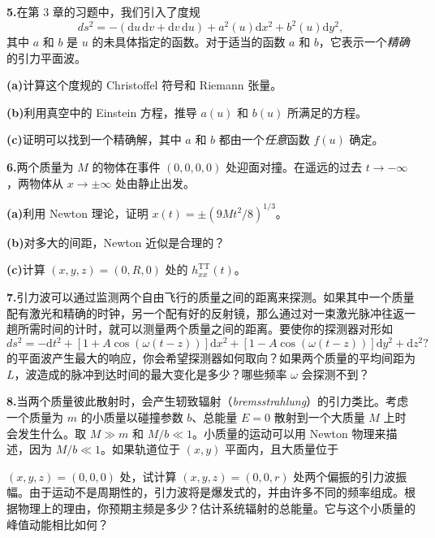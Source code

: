 \textbf{5.}\quad 在第 3 章的习题中，我们引入了度规
\begin{equation*}
ds^2 = -(\mathrm{d}u\,\mathrm{d}v + \mathrm{d}v\,\mathrm{d}u) + a^2(u)\mathrm{d}x^2 + b^2(u)\mathrm{d}y^2,
\tag{7.206}
\end{equation*}
其中 $a$ 和 $b$ 是 $u$ 的未具体指定的函数。对于适当的函数 $a$ 和 $b$，它表示一个\emph{精确}的引力平面波。

\textbf{(a)}\quad 计算这个度规的 Christoffel 符号和 Riemann 张量。

\textbf{(b)}\quad 利用真空中的 Einstein 方程，推导 $a(u)$ 和 $b(u)$ 所满足的方程。

\textbf{(c)}\quad 证明可以找到一个精确解，其中 $a$ 和 $b$ 都由一个\emph{任意}函数 $f(u)$ 确定。

\textbf{6.}\quad 两个质量为 $M$ 的物体在事件 $(0,0,0,0)$ 处迎面对撞。在遥远的过去 $t \to -\infty$，两物体从 $x \to \pm\infty$ 处由静止出发。

\textbf{(a)}\quad 利用 Newton 理论，证明 $x(t) = \pm(9Mt^2/8)^{1/3}$。

\textbf{(b)}\quad 对多大的间距，Newton 近似是合理的？

\textbf{(c)}\quad 计算 $(x, y, z) = (0, R, 0)$ 处的 $h^{\mathrm{TT}}_{xx}(t)$。

\textbf{7.}\quad 引力波可以通过监测两个自由飞行的质量之间的距离来探测。如果其中一个质量配有激光和精确的时钟，另一个配有好的反射镜，那么通过对一束激光脉冲往返一趟所需时间的计时，就可以测量两个质量之间的距离。要使你的探测器对形如
\begin{equation*}
ds^2 = -\mathrm{d}t^2 + \left[1 + A\cos(\omega(t-z))\right]\mathrm{d}x^2 + \left[1 - A\cos(\omega(t-z))\right]\mathrm{d}y^2 + \mathrm{d}z^2?
\end{equation*}
的平面波产生最大的响应，你会希望探测器如何取向？如果两个质量的平均间距为 $L$，波造成的脉冲到达时间的最大变化是多少？哪些频率 $\omega$ 会探测不到？

\textbf{8.}\quad 当两个质量彼此散射时，会产生轫致辐射（\emph{bremsstrahlung}）的引力类比。考虑一个质量为 $m$ 的小质量以碰撞参数 $b$、总能量 $E = 0$ 散射到一个大质量 $M$ 上时会发生什么。取 $M \gg m$ 和 $M/b \ll 1$。小质量的运动可以用 Newton 物理来描述，因为 $M/b \ll 1$。如果轨道位于 $(x, y)$ 平面内，且大质量位于


$(x, y, z) = (0, 0, 0)$ 处，试计算 $(x, y, z) = (0, 0, r)$ 处两个偏振的引力波振幅。由于运动不是周期性的，引力波将是爆发式的，并由许多不同的频率组成。根据物理上的理由，你预期主频是多少？估计系统辐射的总能量。它与这个小质量的峰值动能相比如何？

